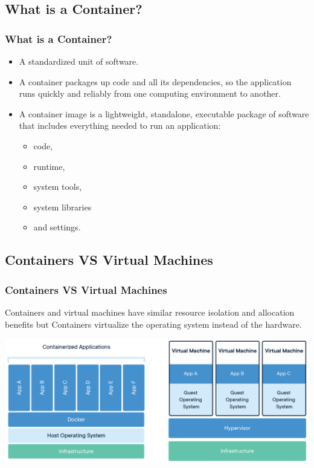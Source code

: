 \subsection{What is a Container?}
\begin{frame}
	\frametitle{What is a Container?}
	\begin{itemize}
		\item A standardized unit of software.
		\item A container packages up code and all its dependencies, so the application runs quickly and reliably from one computing environment to another.
		\item A container image is a lightweight, standalone, executable package of software that includes everything needed to run an application: 
		\begin{itemize}
			\item code, 
			\item runtime, 
			\item system tools, 
			\item system libraries 
			\item and settings.
		\end{itemize}
	\end{itemize}
\end{frame}

\subsection{Containers VS Virtual Machines}
\begin{frame}
	\frametitle{Containers VS Virtual Machines}
	Containers and virtual machines have similar resource isolation and allocation benefits but Containers virtualize the operating system instead of the hardware.
	\linebreak
	
	\centering
	\includegraphics[width=\linewidth]{figures/docker-containerized-and-vm-transparent-bg.png}
\end{frame}

